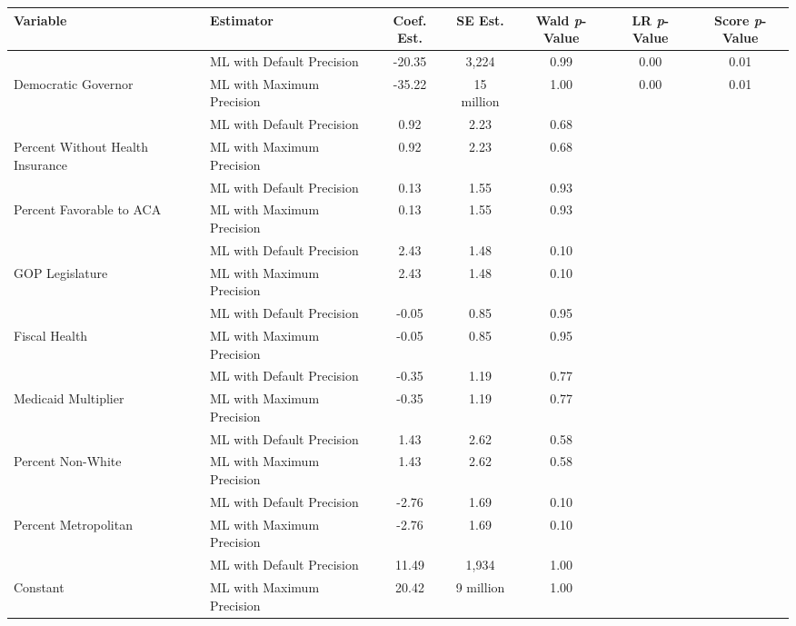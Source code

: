 
\begin{tabular}{llccccc}
\toprule
Variable & Estimator & Coef. Est. & SE Est. & Wald \textit{p}-Value & LR \textit{p}-Value & Score \textit{p}-Value\\
\midrule
 & ML with Default Precision & -20.35 & 3,224 & 0.99 & 0.00 & 0.01\\

\multirow{-2}{*}{\raggedright\arraybackslash Democratic Governor} & ML with Maximum Precision & -35.22 & 15 million & 1.00 & 0.00 & 0.01\\
\cmidrule{1-7}
 & ML with Default Precision & 0.92 & 2.23 & 0.68 &  & \\

\multirow{-2}{*}{\raggedright\arraybackslash Percent Without Health Insurance} & ML with Maximum Precision & 0.92 & 2.23 & 0.68 &  & \\
\cmidrule{1-7}
 & ML with Default Precision & 0.13 & 1.55 & 0.93 &  & \\

\multirow{-2}{*}{\raggedright\arraybackslash Percent Favorable to ACA} & ML with Maximum Precision & 0.13 & 1.55 & 0.93 &  & \\
\cmidrule{1-7}
 & ML with Default Precision & 2.43 & 1.48 & 0.10 &  & \\

\multirow{-2}{*}{\raggedright\arraybackslash GOP Legislature} & ML with Maximum Precision & 2.43 & 1.48 & 0.10 &  & \\
\cmidrule{1-7}
 & ML with Default Precision & -0.05 & 0.85 & 0.95 &  & \\

\multirow{-2}{*}{\raggedright\arraybackslash Fiscal Health} & ML with Maximum Precision & -0.05 & 0.85 & 0.95 &  & \\
\cmidrule{1-7}
 & ML with Default Precision & -0.35 & 1.19 & 0.77 &  & \\

\multirow{-2}{*}{\raggedright\arraybackslash Medicaid Multiplier} & ML with Maximum Precision & -0.35 & 1.19 & 0.77 &  & \\
\cmidrule{1-7}
 & ML with Default Precision & 1.43 & 2.62 & 0.58 &  & \\

\multirow{-2}{*}{\raggedright\arraybackslash Percent Non-White} & ML with Maximum Precision & 1.43 & 2.62 & 0.58 &  & \\
\cmidrule{1-7}
 & ML with Default Precision & -2.76 & 1.69 & 0.10 &  & \\

\multirow{-2}{*}{\raggedright\arraybackslash Percent Metropolitan} & ML with Maximum Precision & -2.76 & 1.69 & 0.10 &  & \\
\cmidrule{1-7}
 & ML with Default Precision & 11.49 & 1,934 & 1.00 &  & \\

\multirow{-2}{*}{\raggedright\arraybackslash Constant} & ML with Maximum Precision & 20.42 & 9 million & 1.00 &  & \\
\bottomrule
\end{tabular}
